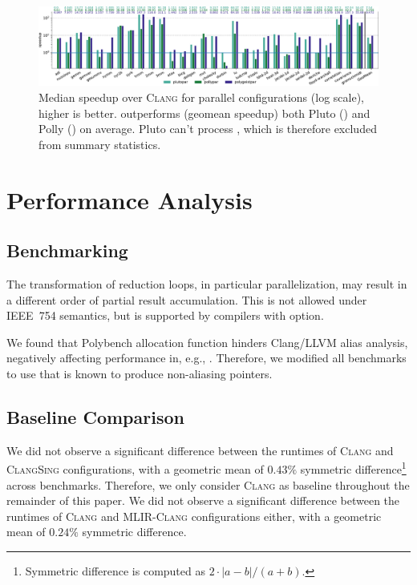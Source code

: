 \begin{figure}
  \centering
  \includegraphics[width=\textwidth]{images/par_speedups.pdf}
  \caption{Median speedup over \textsc{Clang} for parallel configurations (log scale), higher is better. \tool outperforms  (\toolparspeedup geomean speedup) both Pluto (\plutoparspeedup) and Polly (\pollyparspeedup) on average. Pluto can't process , which is therefore excluded from summary statistics.}
  \label{fig:par_speedups}
\end{figure}

\section{Performance Analysis}
\subsection{Benchmarking}
The transformation of reduction loops, in particular parallelization, may result in a different order of partial result accumulation. This is not allowed under IEEE~754 semantics, but is supported by compilers with  option.


We found that Polybench allocation function hinders Clang/LLVM alias analysis, negatively affecting performance in, e.g., . Therefore, we modified all benchmarks to use  that is known to produce non-aliasing pointers.


\subsection{Baseline Comparison}
We did not observe a significant difference between the runtimes of \textsc{Clang} and \textsc{ClangSing} configurations, with a geometric mean of $0.43\%$ symmetric difference\footnote{Symmetric difference is computed as $2 \cdot |a - b| / (a + b)$.} across benchmarks. Therefore, we only consider \textsc{Clang} as baseline throughout the remainder of this paper. We did not observe a significant difference between the runtimes of \textsc{Clang} and \textsc{MLIR-Clang} configurations either, with a geometric mean of $0.24\%$ symmetric difference.

